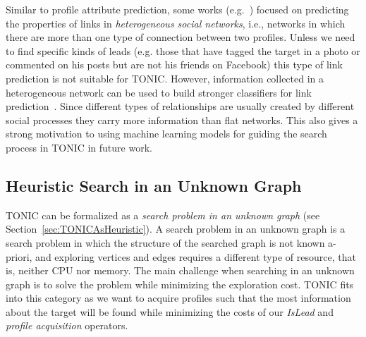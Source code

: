 \documentclass[journal]{IEEEtran}
\newcommand{\islead}[1]{{\em IsLead(#1)}}
\begin{document}
Similar to profile attribute prediction, some works (e.g.~\cite{tang2012inferring}) focused on predicting the properties of links in {\em heterogeneous social networks}, i.e., networks in which there are more than one type of connection between two profiles. 
Unless we need to find specific kinds of leads (e.g. those that have tagged the target in a photo or commented on his posts but are not his friends on Facebook) this type of link prediction is not suitable for TONIC.   
However, information collected in a heterogeneous network can be used to build stronger classifiers for link prediction~\cite{davis2011multi,dong2012link}. 
Since different types of relationships are usually created by different social processes they carry more information than flat networks. 
This also gives a strong motivation to using machine learning models for guiding the search process in TONIC in future work. 




\subsection{Heuristic Search in an Unknown Graph}
\label{sec:theWebAsAnUnknownGraph}
TONIC can be formalized  as a {\em search problem in an unknown graph} (see Section~\ref{sec:TONICAsHeuristic}). A search problem in an unknown graph is a search problem in which the structure of the searched graph is not known a-priori, and exploring vertices and edges requires a different type of resource, that is, neither CPU nor memory. The main challenge when searching in an unknown graph is to solve the problem while minimizing the exploration cost.
TONIC fits into this category  as we want to acquire profiles such that the most information about the target will be found while minimizing the costs of our {\em IsLead} and {\em profile acquisition} operators.
\end{document}
